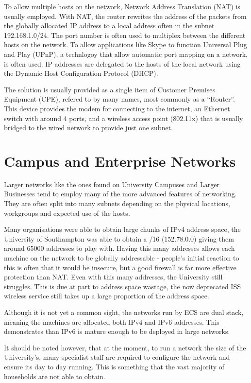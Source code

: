 \documentclass[12pt]{report}
\begin{document}
To allow multiple hosts on the network, Network Address Translation (NAT) is
usually employed. With NAT, the router rewrites the address of the packets from
the globally allocated IP address to a local address often in the subnet
192.168.1.0/24. The port number is often used to multiplex between the
different hosts on the network. To allow applications like Skype to function
Universal Plug and Play (UPnP), a technlogoy that allow automatic port mapping
on a network, is often used. IP addresses are delegated to the hosts of the
local network using the Dynamic Host Configuration Protocol (DHCP). 

The solution is usually provided as a single item of Customer Premises
Equipment (CPE), refered to by many names, most commonly as a ``Router''.
This device provides the modem for connecting to the
internet, an Ethernet switch with around 4 ports, and a wireless access point
(802.11x) that is usually bridged to the wired network to provide just one
subnet. 

\section{Campus and Enterprise Networks}
Larger networks like the ones found on University Campuses and Larger
Businesses tend to employ many of the more advanced features of networking.
They are often split into many subnets depending on the physical locations,
workgroups and expected use of the hosts. 

Many organisations were able to obtain large chunks of IPv4 address space, the
University of Southampton was able to obtain a /16 (152.78.0.0) giving them
around 65000 addresses to play with. Having this many addresses allows each
machine on the network to be globally addressable - people's initial reaction
to this is often that it would be insecure, but a good firewall is far more
effective protection than NAT. Even with this many addresses, the University
still struggles. This is due at part to address space wastage, the now
deprecated ISS wireless service still takes up a large proportion of the
address space.

Although it is not yet a common sight, the networks run by ECS are dual stack,
meaning the machines are allocated both IPv4 and IPv6 addresses. This
demonstrates than IPv6 is mature enough to be deployed in large networks.

It should be noted however, that at the moment, to run a network the size of
the University's, many specialist staff are required to configure the network
and ensure its day to day running. This is something that the vast majority of
households are not able to obtain.
\end{document}
